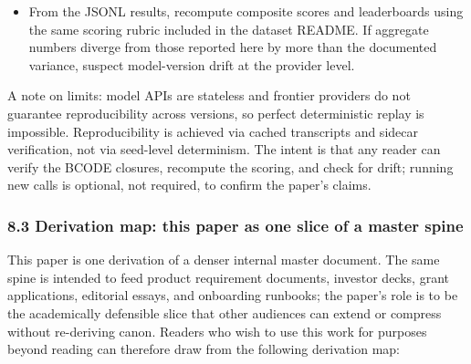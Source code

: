 \begin{enumerate}
  \begin{itemize}
  \tightlist
  \item
    From the JSONL results, recompute composite scores and leaderboards
    using the same scoring rubric included in the dataset README. If
    aggregate numbers diverge from those reported here by more than the
    documented variance, suspect model-version drift at the provider
    level.
  \end{itemize}
\end{enumerate}

A note on limits: model APIs are stateless and frontier providers do not
guarantee reproducibility across versions, so perfect deterministic
replay is impossible. Reproducibility is achieved via cached transcripts
and sidecar verification, not via seed-level determinism. The intent is
that any reader can verify the BCODE closures, recompute the scoring,
and check for drift; running new calls is optional, not required, to
confirm the paper's claims.

\subsubsection{8.3 Derivation map: this paper as one slice of a master
spine}\label{derivation-map-this-paper-as-one-slice-of-a-master-spine}

This paper is one derivation of a denser internal master document. The
same spine is intended to feed product requirement documents, investor
decks, grant applications, editorial essays, and onboarding runbooks;
the paper's role is to be the academically defensible slice that other
audiences can extend or compress without re-deriving canon. Readers who
wish to use this work for purposes beyond reading can therefore draw
from the following derivation map:

